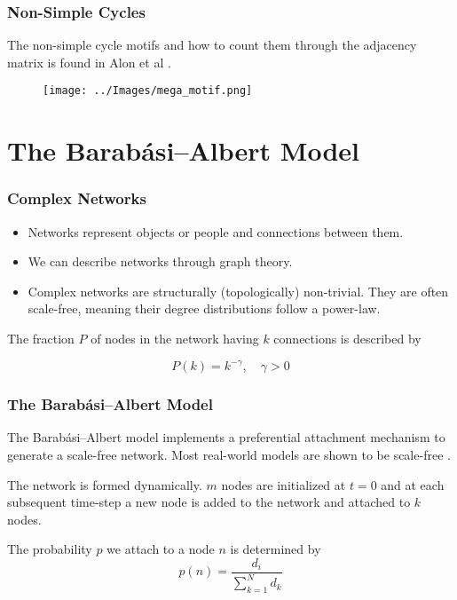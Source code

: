 \documentclass{beamer}
\begin{document}
\begin{frame}
    \frametitle{Non-Simple Cycles}
     The non-simple cycle motifs and how to count them through the adjacency matrix is found in Alon et al \cite{alon}. 
    \begin{figure}
        \texttt{[image: ../Images/mega\_motif.png]}
    \end{figure}
\end{frame}

\section{The Barabási–Albert Model}
\begin{frame}
    \frametitle{Complex Networks}
    \begin{itemize}
    \item Networks represent objects or people and connections between them.
    \item We can describe networks through graph theory.
    \item Complex networks are structurally (topologically) non-trivial. They are often scale-free,
        meaning their degree distributions follow a power-law.
    \end{itemize}
        
        The fraction $P$ of nodes in the network having $k$ connections is described by 

        $$
        P(k)= k^{-\gamma},\quad \gamma>0
        $$

\end{frame}

\begin{frame} %
\frametitle{The Barabási–Albert Model}
The Barabási–Albert model implements a preferential attachment mechanism to generate a 
scale-free network. Most real-world models are shown to be scale-free \cite{barabasi2016network}.

\vspace{3mm}

The network is formed dynamically.
$m$ nodes are initialized at $t=0$ and at each subsequent time-step a new node is added to the network 
and attached to $k$ nodes.

\vspace{3mm}

The probability $p$ we attach to a node $n$ is determined by 
$$
p(n) = \frac{d_i}{\sum^{N}_{k=1}d_k}
$$
\end{frame}
\end{document}
